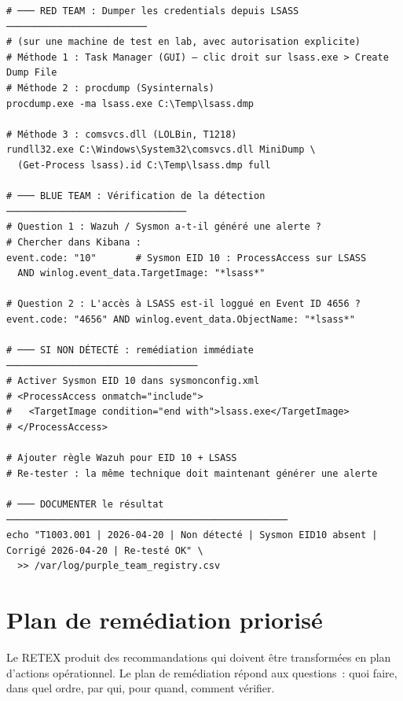 \begin{lstlisting}[style=StyleTerminal,
  caption={Exemple de scénario Purple Team --- T1003.001 LSASS Dumping},
  label={lst:purple-team}]
# ─── RED TEAM : Dumper les credentials depuis LSASS ─────────────────────────
# (sur une machine de test en lab, avec autorisation explicite)
# Méthode 1 : Task Manager (GUI) — clic droit sur lsass.exe > Create Dump File
# Méthode 2 : procdump (Sysinternals)
procdump.exe -ma lsass.exe C:\Temp\lsass.dmp

# Méthode 3 : comsvcs.dll (LOLBin, T1218)
rundll32.exe C:\Windows\System32\comsvcs.dll MiniDump \
  (Get-Process lsass).id C:\Temp\lsass.dmp full

# ─── BLUE TEAM : Vérification de la détection ────────────────────────────────
# Question 1 : Wazuh / Sysmon a-t-il généré une alerte ?
# Chercher dans Kibana :
event.code: "10"       # Sysmon EID 10 : ProcessAccess sur LSASS
  AND winlog.event_data.TargetImage: "*lsass*"

# Question 2 : L'accès à LSASS est-il loggué en Event ID 4656 ?
event.code: "4656" AND winlog.event_data.ObjectName: "*lsass*"

# ─── SI NON DÉTECTÉ : remédiation immédiate ──────────────────────────────────
# Activer Sysmon EID 10 dans sysmonconfig.xml
# <ProcessAccess onmatch="include">
#   <TargetImage condition="end with">lsass.exe</TargetImage>
# </ProcessAccess>

# Ajouter règle Wazuh pour EID 10 + LSASS
# Re-tester : la même technique doit maintenant générer une alerte

# ─── DOCUMENTER le résultat ──────────────────────────────────────────────────
echo "T1003.001 | 2026-04-20 | Non détecté | Sysmon EID10 absent | Corrigé 2026-04-20 | Re-testé OK" \
  >> /var/log/purple_team_registry.csv
\end{lstlisting}

\section{Plan de remédiation priorisé}
\label{sec:plan-remediation}

Le RETEX produit des recommandations qui doivent être transformées
en plan d'actions opérationnel. Le plan de remédiation répond aux
questions~: quoi faire, dans quel ordre, par qui, pour quand,
comment vérifier.

